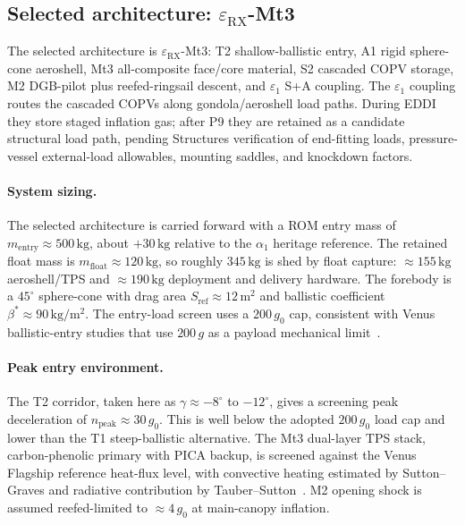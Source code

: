 \subsection{Selected architecture: \texorpdfstring{$\varepsilon_{\mathrm{RX}}$}{epsilonRX}-Mt3}
\label{sec:8-4}

The selected architecture is $\varepsilon_{\mathrm{RX}}$-Mt3: T2 shallow-ballistic entry, A1 rigid sphere-cone aeroshell, Mt3 all-composite face/core material, S2 cascaded COPV storage, M2 DGB-pilot plus reefed-ringsail descent, and $\varepsilon_1$ S+A coupling. The $\varepsilon_1$ coupling routes the cascaded COPVs along gondola/aeroshell load paths. During EDDI they store staged inflation gas; after P9 they are retained as a candidate structural load path, pending Structures verification of end-fitting loads, pressure-vessel external-load allowables, mounting saddles, and knockdown factors.

\paragraph*{System sizing.} The selected architecture is carried forward with a ROM entry mass of $m_\text{entry}\approx500\,\mathrm{kg}$, about $+30\,\mathrm{kg}$ relative to the $\alpha_1$ heritage reference. The retained float mass is $m_\text{float}\approx120\,\mathrm{kg}$, so roughly $345\,\mathrm{kg}$ is shed by float capture: $\approx155\,\mathrm{kg}$ aeroshell/TPS and $\approx190\,\mathrm{kg}$ deployment and delivery hardware. The forebody is a $45^\circ$ sphere-cone with drag area $S_\text{ref}\approx12\,\mathrm{m^2}$ and ballistic coefficient $\beta^{*}\approx90\,\mathrm{kg/m^2}$. The entry-load screen uses a $200\,g_0$ cap, consistent with Venus ballistic-entry studies that use $200\,g$ as a payload mechanical limit~\cite{Prabhu2013VenusEntry}.

\paragraph*{Peak entry environment.} The T2 corridor, taken here as $\gamma\approx-8^\circ$ to $-12^\circ$, gives a screening peak deceleration of $n_\text{peak}\approx30\,g_0$. This is well below the adopted $200\,g_0$ load cap and lower than the T1 steep-ballistic alternative. The Mt3 dual-layer TPS stack, carbon-phenolic primary with PICA backup, is screened against the Venus Flagship reference heat-flux level, with convective heating estimated by Sutton--Graves and radiative contribution by Tauber--Sutton~\cite{venkatapathy2020,SuttonGraves1971,TauberSutton1991}. M2 opening shock is assumed reefed-limited to $\approx4\,g_0$ at main-canopy inflation.

